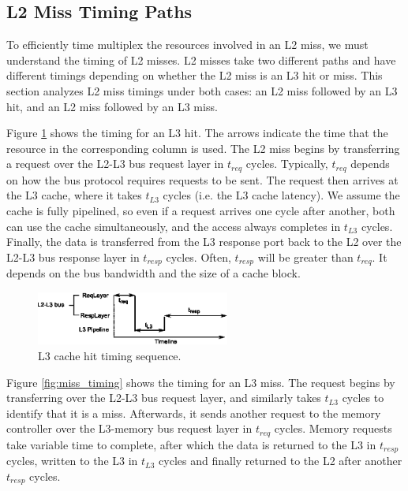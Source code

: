 
\subsection{L2 Miss Timing Paths}
To efficiently time multiplex the resources involved in an L2 miss, 
we must understand the timing of L2 misses. L2 misses take two different 
paths and have different timings depending on whether the L2 miss is an L3 hit 
or miss. This section analyzes L2 miss timings under both cases: an L2 miss
followed by an L3 hit, and an L2 miss followed by an L3 miss.

Figure \ref{fig:hit_timing} shows the timing for an L3 hit. The arrows 
indicate the time that the resource in the corresponding column is used.
The L2 miss begins by transferring a request over the L2-L3 bus request layer 
in $t_{req}$ cycles. Typically, $t_{req}$ depends on how the bus protocol 
requires requests to be sent. The request then arrives at the L3 cache, where 
it takes $t_{L3}$ cycles (i.e. the L3 cache latency). We assume the cache is 
fully pipelined, so even if a request arrives one cycle after another, both can 
use the cache simultaneously, and the access always completes in $t_{L3}$ 
cycles. Finally, the data is transferred from the L3 response port back to the 
L2 over the L2-L3 bus response layer in $t_{resp}$ cycles. Often, $t_{resp}$ 
will be greater than $t_{req}$. It depends on the bus bandwidth and the size of 
a cache block.

\begin{figure}
    \begin{center}
        \includegraphics[width=2.5in]{figs/hit_timing.eps}
        \caption{L3 cache hit timing sequence.}
        \label{fig:hit_timing}
		\vspace{-0.2in}
    \end{center}
\end{figure}

Figure \ref{fig:miss_timing} shows the timing for an L3 miss. The request 
begins by transferring over the L2-L3 bus request layer, and similarly takes 
$t_{L3}$ cycles to identify that it is a miss. Afterwards, it sends another 
request to the memory controller over the L3-memory bus request layer in 
$t_{req}$ cycles. Memory requests take variable time to complete, after which 
the data is returned to the L3 in $t_{resp}$ cycles, written to the L3 in 
$t_{L3}$ cycles and finally returned to the L2 after another $t_{resp}$ cycles.

